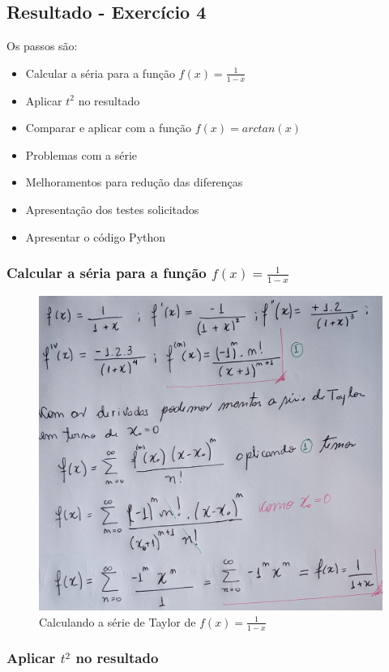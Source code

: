 \subsection{Resultado - Exercício 4}

Os passos são:
\begin{itemize}[leftmargin=3.5em, itemsep=-.5mm, topsep=0.5mm]
    \item Calcular a séria para a função $f(x) = \frac{1}{1 - x}$
    \item Aplicar $t^2$ no resultado
    \item Comparar e aplicar com a função $f(x) = arctan(x)$
    \item Problemas com a série
    \item Melhoramentos para redução das diferenças
    \item Apresentação dos testes solicitados
    \item Apresentar o código Python
\end{itemize}

\newpage

\subsubsection{Calcular a séria para a função $f(x) = \frac{1}{1 - x}$}
\begin{figure}[H]
    \centering
    \includegraphics[width=.7\textwidth]{imagens/exercicio4_parte1}
    \caption{Calculando a série de Taylor de $f(x) = \frac{1}{1 - x}$}
    \label{fig:exe4_parte1}
\end{figure}

\subsubsection{Aplicar $t^2$ no resultado}

